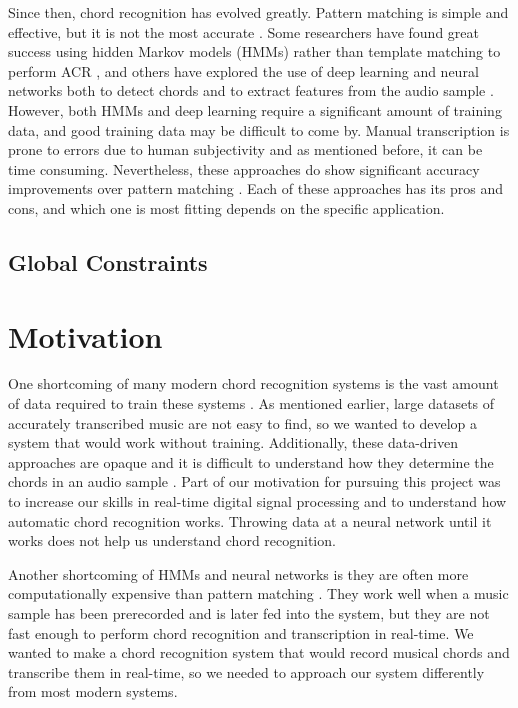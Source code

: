 \documentclass[journal]{IEEEtran}
\begin{document}
Since then, chord recognition has evolved greatly.
Pattern matching is simple and effective, but it is not the most accurate \cite{jiang}.
Some researchers have found great success using hidden Markov models (HMMs) rather than template matching to perform ACR \cite{sheh}, and others have explored the use of deep learning and neural networks both to detect chords \cite{boulanger} and to extract features from the audio sample \cite{korzeniowski}.
However, both HMMs and deep learning require a significant amount of training data, and good training data may be difficult to come by.
Manual transcription is prone to errors due to human subjectivity \cite{pauwels} and as mentioned before, it can be time consuming.
Nevertheless, these approaches do show significant accuracy improvements over pattern matching \cite{jiang, boulanger}.
Each of these approaches has its pros and cons, and which one is most fitting depends on the specific application.


\subsection{Global Constraints}

\section{Motivation}
One shortcoming of many modern chord recognition systems is the vast amount of data required to train these systems \cite{pauwels}.
As mentioned earlier, large datasets of accurately transcribed music are not easy to find, so we wanted to develop a system that would work without training.
Additionally, these data-driven approaches are opaque and it is difficult to understand how they determine the chords in an audio sample \cite{pauwels}.
Part of our motivation for pursuing this project was to increase our skills in real-time digital signal processing and to understand how automatic chord recognition works.
Throwing data at a neural network until it works does not help us understand chord recognition.

Another shortcoming of HMMs and neural networks is they are often more computationally expensive than pattern matching \cite{stark}.
They work well when a music sample has been prerecorded and is later fed into the system, but they are not fast enough to perform chord recognition and transcription in real-time.
We wanted to make a chord recognition system that would record musical chords and transcribe them in real-time, so we needed to approach our system differently from most modern systems.
\end{document}

